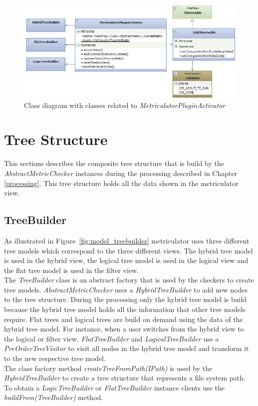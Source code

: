 \documentclass[11pt,a4paper,oneside]{scrreprt}
\begin{document}
\begin{figure}[th]
\begin{center}
\includegraphics[scale=0.8]{figures/pluginactivator.png}
\end{center}
\caption{Class diagram with classes related to \textit{MetriculatorPluginActivator}}
\label{fig:plugin_activator}
\end{figure}

\section{Tree Structure}
This sections describes the composite tree structure that is build by the \textit{AbstractMetricChecker} instances during the processing described in Chapter \ref{processing}. This tree structure holds all the data shown in the metriculator view.

\subsection{TreeBuilder}\label{treebuilder}
As illustrated in Figure~\ref{fig:model_treebuilder} metriculator uses three different tree models which correspond to the three different views. The hybrid tree model is used in the hybrid view, the logical tree model is used in the logical view and the flat tree model is used in the filter view.\\
The \textit{TreeBuilder} class is an abstract factory that is used by the checkers to create tree models. \textit{AbstractMetricChecker} uses a \textit{HybridTreeBuilder} to add new nodes to the tree structure. During the processing only the hybrid tree model is build because the hybrid tree model holds all the information that other tree models require. Flat trees and logical trees are build on demand using the data of the hybrid tree model. For instance, when a user switches from the hybrid view to the logical or filter view. \textit{FlatTreeBuilder} and \textit{LogicalTreeBuilder} use a \textit{PreOrderTreeVisitor} to visit all nodes in the hybrid tree model and transform it to the new respective tree model.\\
The class factory method \textit{createTreeFromPath(IPath)} is used by the \textit{HybridTreeBuilder} to create a tree structure that represents a file system path. To obtain a \textit{LogicTreeBuilder} or \textit{FlatTreeBuilder} instance clients use the \textit{buildFrom(TreeBuilder)} method.
\end{document}

